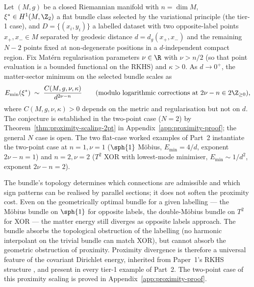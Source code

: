 \begin{conjecture}
\label{conj:matter-proximity-scaling}
Let $(M,g)$ be a closed Riemannian manifold with $n=\dim M$,
$\xi^*\in H^1(M,\Z_2)$ a flat bundle class selected by the
variational principle (the tier-1 case), and $D=\{(x_i,y_i)\}$ a
labelled dataset with two opposite-label points $x_+,x_-\in M$
separated by geodesic distance $d=d_g(x_+,x_-)$ and the remaining
$N-2$ points fixed at non-degenerate positions in a $d$-independent
compact region. Fix Mat\'ern regularisation
parameters $\nu\in\R$ with $\nu>n/2$ (so that point evaluation is a
bounded functional on the RKHS) and $\kappa>0$. As $d\to 0^+$, the
matter-sector minimum on the selected bundle scales as
\[
   E_{\min}(\xi^*) \;\sim\; \frac{C(M,g,\nu,\kappa)}{d^{2\nu-n}}
   \qquad\text{(modulo logarithmic corrections at $2\nu-n\in 2\Z_{\geq 0}$),}
\]
where $C(M,g,\nu,\kappa)>0$ depends on the metric and regularisation
but not on $d$. The conjecture is established in the two-point case
($N=2$) by Theorem~\ref{thm:proximity-scaling-2pt} in
Appendix~\ref{app:proximity-proof}; the general $N$ case is open.
The two flat-case worked examples of Part~2 instantiate the
two-point case at $n=1, \nu=1$ ($\sph{1}$ M\"obius, $E_{\min}=4/d$,
exponent $2\nu-n=1$) and $n=2, \nu=2$ ($T^2$ XOR with lowest-mode
minimiser, $E_{\min}\sim 1/d^2$, exponent $2\nu-n=2$).
\end{conjecture}

\begin{remark}\label{rem:proximity-not-topology}
The bundle's topology determines which connections are admissible
and which sign patterns can be realised by parallel sections; it
does not soften the proximity cost. Even on the geometrically
optimal bundle for a given labelling --- the M\"obius bundle on
$\sph{1}$ for opposite labels, the double-M\"obius bundle on $T^2$
for XOR --- the matter energy still diverges as opposite labels
approach. The bundle absorbs the topological obstruction of the
labelling (no harmonic interpolant on the trivial bundle can match
XOR), but cannot absorb the geometric obstruction of proximity.
Proximity divergence is therefore a universal feature of the
covariant Dirichlet energy, inherited from Paper~1's RKHS structure
\cite[Theorem~13.3]{Vasii2026Paper1}, and present in every tier-1 example
of Part~2. The two-point case of this proximity scaling is proved in
Appendix~\ref{app:proximity-proof}.
\end{remark}


